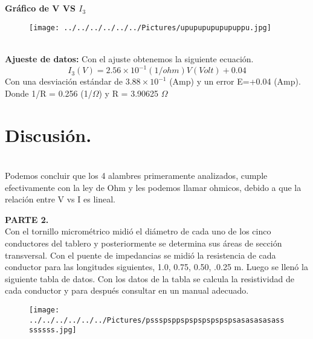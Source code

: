 \documentclass[11pt,a4paper]{article}
\begin{document}
\\
\\
\textbf{Gr\'{a}fico de V VS ${I}_{3}$}
\\
\begin{figure}[hbtp]
\centering
\texttt{[image: ../../../../../../Pictures/upupupupupupuppu.jpg]} 
\end{figure}
\\
\textbf{Ajueste de datos:} Con el ajuste obtenemos la siguiente ecuaci\'{o}n.
\[{I}_{3}(V)=2.56\times {10}^{-1} (1/ohm)V (Volt) + 0.04  \]
Con una desviaci\'{o}n est\'{a}ndar de $3.88 \times {10}^{-1}$ (Amp)  y un error E=+0.04 (Amp). Donde 1/R = 0.256 (1/$\Omega	$) y R = 3.90625 $\Omega$
\\
\section*{Discusi\'{o}n.}\\
Podemos concluir que los 4 alambres primeramente analizados, cumple efectivamente con la ley de Ohm y les podemos llamar ohmicos, debido a que la relaci\'{o}n entre V vs I es lineal.
\\
\pagebreak


\textbf{PARTE 2.}
\\
Con el tornillo microm\'{e}trico midi\'{o} el di\'{a}metro de cada uno de los cinco conductores del tablero y posteriormente se determina sus \'{a}reas de secci\'{o}n transversal. Con el puente de impedancias se midi\'{o} la resistencia de cada conductor para las longitudes siguientes, 1.0, 0.75, 0.50, .0.25 m. Luego se llen\'{o} la siguiente tabla de datos. Con los datos de la tabla se calcula la resistividad de cada conductor y para despu\'{e}s consultar en un manual adecuado.
\\
\begin{figure}[hbtp]
\centering
\texttt{[image: ../../../../../../Pictures/pssspsppspspspspspspsasasasasassssssss.jpg]}
\end{figure}
\\
\end{document}
